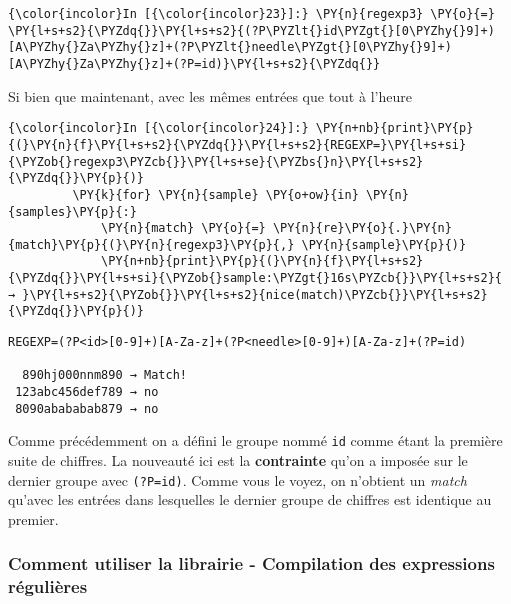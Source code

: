     \begin{Verbatim}[commandchars=\\\{\},frame=single,framerule=0.3mm,rulecolor=\color{cellframecolor}]
{\color{incolor}In [{\color{incolor}23}]:} \PY{n}{regexp3} \PY{o}{=} \PY{l+s+s2}{\PYZdq{}}\PY{l+s+s2}{(?P\PYZlt{}id\PYZgt{}[0\PYZhy{}9]+)[A\PYZhy{}Za\PYZhy{}z]+(?P\PYZlt{}needle\PYZgt{}[0\PYZhy{}9]+)[A\PYZhy{}Za\PYZhy{}z]+(?P=id)}\PY{l+s+s2}{\PYZdq{}}
\end{Verbatim}


    Si bien que maintenant, avec les mêmes entrées que tout à l'heure

    \begin{Verbatim}[commandchars=\\\{\},frame=single,framerule=0.3mm,rulecolor=\color{cellframecolor}]
{\color{incolor}In [{\color{incolor}24}]:} \PY{n+nb}{print}\PY{p}{(}\PY{n}{f}\PY{l+s+s2}{\PYZdq{}}\PY{l+s+s2}{REGEXP=}\PY{l+s+si}{\PYZob{}regexp3\PYZcb{}}\PY{l+s+se}{\PYZbs{}n}\PY{l+s+s2}{\PYZdq{}}\PY{p}{)}
         \PY{k}{for} \PY{n}{sample} \PY{o+ow}{in} \PY{n}{samples}\PY{p}{:}
             \PY{n}{match} \PY{o}{=} \PY{n}{re}\PY{o}{.}\PY{n}{match}\PY{p}{(}\PY{n}{regexp3}\PY{p}{,} \PY{n}{sample}\PY{p}{)}
             \PY{n+nb}{print}\PY{p}{(}\PY{n}{f}\PY{l+s+s2}{\PYZdq{}}\PY{l+s+si}{\PYZob{}sample:\PYZgt{}16s\PYZcb{}}\PY{l+s+s2}{ → }\PY{l+s+s2}{\PYZob{}}\PY{l+s+s2}{nice(match)\PYZcb{}}\PY{l+s+s2}{\PYZdq{}}\PY{p}{)}
\end{Verbatim}


    \begin{Verbatim}[commandchars=\\\{\},frame=single,framerule=0.3mm,rulecolor=\color{cellframecolor}]
REGEXP=(?P<id>[0-9]+)[A-Za-z]+(?P<needle>[0-9]+)[A-Za-z]+(?P=id)

  890hj000nnm890 → Match!
 123abc456def789 → no
 8090abababab879 → no
\end{Verbatim}

    Comme précédemment on a défini le groupe nommé \texttt{id} comme étant
la première suite de chiffres. La nouveauté ici est la
\textbf{contrainte} qu'on a imposée sur le dernier groupe avec
\texttt{(?P=id)}. Comme vous le voyez, on n'obtient un \emph{match}
qu'avec les entrées dans lesquelles le dernier groupe de chiffres est
identique au premier.

    \hypertarget{comment-utiliser-la-librairie---compilation-des-expressions-ruxe9guliuxe8res}{%
\subsubsection{Comment utiliser la librairie - Compilation des
expressions
régulières}\label{comment-utiliser-la-librairie---compilation-des-expressions-ruxe9guliuxe8res}}


